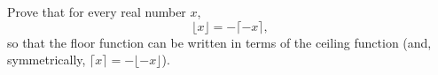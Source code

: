 Prove that for every real number $x$,
\[
\lfloor x\rfloor=-\lceil -x\rceil ,
\]
so that the floor function can be written in terms of the ceiling function (and, symmetrically, $\lceil x\rceil=-\lfloor -x\rfloor$).
